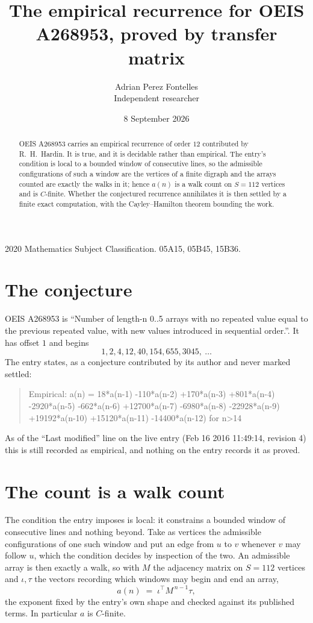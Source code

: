 \documentclass[11pt,a4paper]{article}
\title{The empirical recurrence for OEIS A268953, proved by transfer matrix}
\author{Adrian Perez Fontelles\\ \small Independent researcher}
\date{8 September 2026}
\theoremstyle{plain}
\theoremstyle{definition}
\begin{document}
\maketitle

\begin{abstract}
OEIS A268953 carries an empirical recurrence of order $12$ contributed by R.~H.~Hardin. It is
true, and it is decidable rather than empirical. The entry's condition is local to a bounded window of consecutive lines, so
the admissible configurations of such a window are the vertices of a finite digraph and the
arrays counted are exactly the walks in it; hence $a(n)$ is a walk count on $S=112$ vertices
and is $C$-finite. Whether the conjectured recurrence annihilates it is then settled by a
finite exact computation, with the Cayley--Hamilton theorem bounding the work.
\end{abstract}

\noindent\small 2020 Mathematics Subject Classification. 05A15, 05B45, 15B36.\normalsize

\section{The conjecture}

OEIS A268953 is ``Number of length-n 0..5 arrays with no repeated value equal to the previous repeated value, with new values introduced in sequential order.''. It has offset $1$ and begins
\[
1, 2, 4, 12, 40, 154, 655, 3045,\ \dots
\]
The entry states, as a conjecture contributed by its author and never marked settled:
\begin{quote}
Empirical: a(n) = 18*a(n-1) -110*a(n-2) +170*a(n-3) +801*a(n-4) -2920*a(n-5) -662*a(n-6) +12700*a(n-7) -6980*a(n-8) -22928*a(n-9) +19192*a(n-10) +15120*a(n-11) -14400*a(n-12) for n>14
\end{quote}
As of the ``Last modified'' line on the live entry (Feb 16 2016 11:49:14, revision 4) this is still
recorded as empirical, and nothing on the entry records it as proved.

\section{The count is a walk count}

The condition the entry imposes is local: it constrains a bounded window of consecutive lines and nothing beyond. Take as
vertices the admissible configurations of one such window and put an edge from $u$ to $v$
whenever $v$ may follow $u$, which the condition decides by inspection of the two. An
admissible array is then exactly a walk, so with $M$ the adjacency matrix on $S=112$ vertices
and $\iota,\tau$ the vectors recording which windows may begin and end an array,
\[
a(n)\;=\;\iota^{\!\top}M^{\,n-1}\tau ,
\]
the exponent fixed by the entry's own shape and checked against its published terms. In
particular $a$ is $C$-finite.
\end{document}
